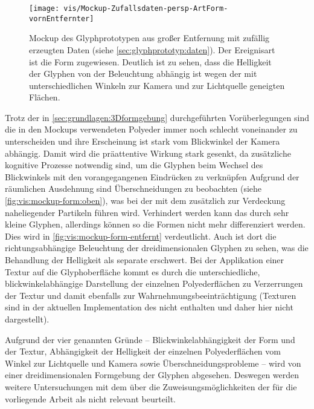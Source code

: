 \begin{figure}
	\texttt{[image: vis/Mockup-Zufallsdaten-persp-ArtForm-vornEntfernter]}
	\caption{Mockup des Glyphprototypen aus großer Entfernung mit zufällig erzeugten Daten (siehe \autoref{sec:glyphprototyp:daten}). Der Ereignisart ist die Form zugewiesen. Deutlich ist zu sehen, dass die Helligkeit der Glyphen von der Beleuchtung abhängig ist wegen der mit unterschiedlichen Winkeln zur Kamera und zur Lichtquelle geneigten Flächen.}\label{fig:vis:mockup-form-entfernt}
\end{figure}

Trotz der in \autoref{sec:grundlagen:3Dformgebung} durchgeführten Vorüberlegungen sind die in den Mockups verwendeten Polyeder immer noch schlecht voneinander zu unterscheiden und ihre Erscheinung ist stark vom Blickwinkel der Kamera abhängig. Damit wird die präattentive Wirkung stark gesenkt, da zusätzliche kognitive Prozesse notwendig sind, um die Glyphen beim Wechsel des Blickwinkels mit den vorangegangenen Eindrücken zu verknüpfen
Aufgrund der räumlichen Ausdehnung sind Überschneidungen zu beobachten (siehe \autoref{fig:vis:mockup-form:oben}), was bei der  mit dem  zusätzlich zur Verdeckung naheliegender Partikeln führen wird. Verhindert werden kann das durch sehr kleine Glyphen, allerdings können so die Formen nicht mehr differenziert werden. Dies wird in \autoref{fig:vis:mockup-form-entfernt} verdeutlicht. Auch ist dort die richtungsabhängige Beleuchtung der dreidimensionalen Glyphen zu sehen, was die Behandlung der Helligkeit als separate  erschwert. Bei der Applikation einer Textur auf die Glyphoberfläche kommt es durch die unterschiedliche, blickwinkelabhängige Darstellung der einzelnen Polyederflächen zu Verzerrungen der Textur und damit ebenfalls zur Wahrnehmungsbeeinträchtigung (Texturen sind in der aktuellen Implementation des  nicht enthalten und daher hier nicht dargestellt).

Aufgrund der vier genannten Gründe -- Blickwinkelabhängigkeit der Form und der Textur, Abhängigkeit der Helligkeit der einzelnen Polyederflächen vom Winkel zur Lichtquelle und Kamera sowie Überschneidungsprobleme -- wird von einer dreidimensionalen Formgebung der Glyphen abgesehen. Deswegen werden weitere Untersuchungen mit dem  über die Zuweisungsmöglichkeiten der  für die vorliegende Arbeit als nicht relevant beurteilt.

